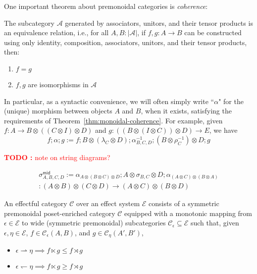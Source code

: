 \documentclass[acmsmall,screen,review]{acmart}
\newcounter{todos}
\newcommand{\TODO}[1]{{
  \stepcounter{todos}
  \begin{center}\large{\textcolor{red}{\textbf{TODO \arabic{todos}:} #1}}\end{center}
}}
\newcommand{\mc}[1]{\ensuremath{\mathcal{#1}}}
\newcommand{\ms}[1]{\ensuremath{\mathsf{#1}}}
\newcommand{\rightmove}{\rightharpoonup}
\newcommand{\leftmove}{\leftharpoondown}
\begin{document}
One important theorem about premonoidal categories is \emph{coherence}:
\begin{theorem}
  The subcategory $\mc{A}$ generated by associators, unitors, and their tensor products is an
  equivalence relation, i.e., for all $A, B : |\mc{A}|$, if
  $f, g : A \to B$ can be constructed using only identity, composition, associators, unitors, and
  their tensor products, then:
  \begin{enumerate}[label=(\alph*)]
    \item $f = g$
    \item $f, g$ are isomorphisms in $\mc{A}$
  \end{enumerate}
  \label{thm:monoidal-coherence}
\end{theorem}
In particular, as a syntactic convenience, we will often simply write ``$\alpha$" for the (unique)
morphism between objects $A$ and $B$, when it exists, satisfying the requirements of
Theorem~\ref{thm:monoidal-coherence}. For example, given $f : A \to B \otimes ((C \otimes I)
\otimes D)$ and $g : ((B \otimes (I \otimes C)) \otimes D) \to E$, we have
$$
f;\alpha;g := 
  f ; 
  B \otimes (\lambda_C \otimes D) ; 
  \alpha_{B, C, D}^{-1} ; 
  (B \otimes \rho_C^{-1}) \otimes D ;
  g 
$$

\TODO{note on string diagrams?}

\begin{multline*}
  \sigma^{\ms{mid}}_{A, B, C, D} := 
  \alpha_{A \otimes (B \otimes C) \otimes D}
  ; A \otimes \sigma_{B, C} \otimes D
  ; \alpha_{(A \otimes C) \otimes (B \otimes A)}
  \\ : (A \otimes B) \otimes (C \otimes D) \to (A \otimes C) \otimes (B \otimes D)
\end{multline*}

\begin{definition}
  An effectful category $\mc{C}$ over an effect system $\mc{E}$ consists of a symmetric premonoidal
  poset-enriched category $\mc{C}$ equipped with a  monotonic mapping from $\epsilon \in \mc{E}$ to
  wide (symmetric premonoidal) subcategories $\mc{C}_\epsilon \subseteq \mc{E}$ such that, given
  $\epsilon, \eta \in \mc{E}$, $f \in \mc{C}_\epsilon(A, B)$, and $g \in \mc{C}_\eta(A', B')$, 
  \begin{itemize}
    \item $\epsilon \rightmove \eta \implies f \ltimes g \leq f \rtimes g$
    \item $\epsilon \leftmove \eta \implies f \ltimes g \geq f \rtimes g$
  \end{itemize}
\end{definition}
\end{document}

